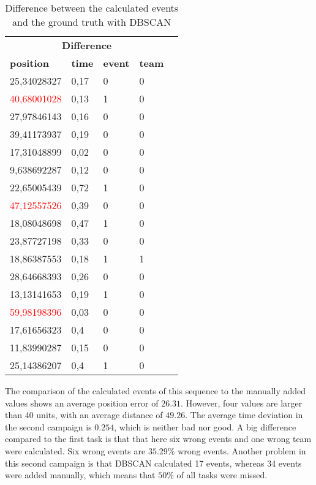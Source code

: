 \begin{table}[H]
    \begin{center}
		\begin{tabular}{|l|l|l|l|l}
			\hline
            \multicolumn{4}{|c|}{\large \textbf{Difference}} \\
			\hhline{====}
			\textbf{position} & \textbf{time} & \textbf{event} & \textbf{team} \\
			\hline
			25,34028327 & 0,17 & 0 & 0\\
			\hline
            \textcolor{red}{40,68001028} & 0,13 & 1 & 0\\
			\hline
            27,97846143 & 0,16 & 0 & 0\\
			\hline
            39,41173937 & 0,19 & 0 & 0\\
			\hline
            17,31048899 & 0,02 & 0 & 0\\
			\hline
            9,638692287 & 0,12 & 0 & 0\\
			\hline
            22,65005439 & 0,72 & 1 & 0\\
			\hline
            \textcolor{red}{47,12557526} & 0,39 & 0 & 0\\
			\hline
            18,08048698 & 0,47 & 1 & 0\\
			\hline
            23,87727198 & 0,33 & 0 & 0\\
			\hline
            18,86387553 & 0,18 & 1 & 1\\
			\hline
            28,64668393 & 0,26 & 0 & 0\\
			\hline
            13,13141653 & 0,19 & 1 & 0\\
			\hline
            \textcolor{red}{59,98198396} & 0,03 & 0 & 0\\
			\hline
            17,61656323 & 0,4 & 0 & 0\\
			\hline
            11,83990287 & 0,15 & 0 & 0\\
			\hline
            25,14386207 & 0,4 & 1 & 0\\
			\hline
		\end{tabular}
    \end{center}
    \caption{Difference between the calculated events and the ground truth with DBSCAN}
\end{table}

The comparison of the calculated events of this sequence to the manually added values shows an average position error of $26.31$. However, four values are larger than 40 units, with an average distance of $49.26$. The average time deviation in the second campaign is $0.254$, which is neither bad nor good.
A big difference compared to the first task is that that here six wrong events and one wrong team were calculated. Six wrong events are $35.29\%$ wrong events.
Another problem in this second campaign is that DBSCAN calculated 17 events, whereas  34 events were added manually, which means that $50\%$ of all tasks were missed.

